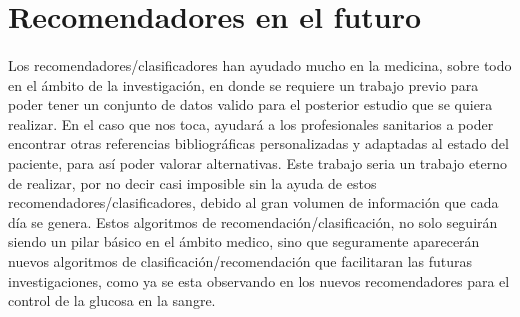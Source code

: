 \newpage
\section{Recomendadores en el futuro}

\paragraph{}
Los recomendadores/clasificadores han ayudado mucho en la medicina, sobre todo en el ámbito de la investigación, en donde se requiere un trabajo previo para poder tener un conjunto de datos valido para el posterior estudio que se quiera realizar. En el caso que nos toca, ayudará a los profesionales sanitarios a poder encontrar otras referencias bibliográficas personalizadas y adaptadas al estado del paciente, para así poder valorar alternativas. Este trabajo seria un trabajo eterno de realizar, por no decir casi imposible sin la ayuda de estos recomendadores/clasificadores, debido al gran volumen de información que cada día se genera. Estos algoritmos de recomendación/clasificación, no solo seguirán siendo un pilar básico en el ámbito medico, sino que seguramente aparecerán nuevos algoritmos de clasificación/recomendación que facilitaran las futuras investigaciones, como ya se esta observando en los nuevos recomendadores para el control de la glucosa en la sangre\cite{ref:refer_diabetes_control}.
